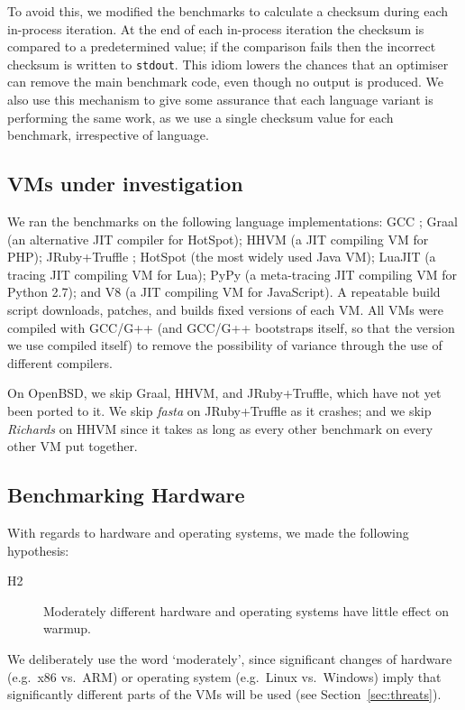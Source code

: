 \documentclass[preprint,numbers,10pt]{sigplanconf}
\newcommand{\hyptwo}{H2\xspace}
\newcommand{\richards}{\emph{Richards}\xspace}
\newcommand{\fasta}{\emph{fasta}\xspace}
\begin{document}
To avoid this, we modified the benchmarks to calculate a checksum
during each in-process iteration. At the end of each in-process iteration
the checksum is compared to a predetermined value; if the comparison fails then
the incorrect checksum is written to \texttt{stdout}. This idiom
lowers the chances that an optimiser can remove the main benchmark
code, even though no output is produced. We also use this mechanism to give some assurance
that each language variant is performing the same work, as we use a single
checksum value for each benchmark, irrespective of language.


\subsection{VMs under investigation}

We ran the benchmarks on the following language implementations: GCC \gccversion;
Graal \graalversion (an alternative JIT compiler for HotSpot); HHVM \hhvmversion (a JIT
compiling VM for PHP); JRuby+Truffle \jrubytruffleversion{};
HotSpot \hotspotversion (the most widely used Java
VM); LuaJIT \luajitversion (a tracing JIT compiling VM for Lua); PyPy \pypyversion (a
meta-tracing JIT compiling VM for Python 2.7); and V8 \veightversion (a JIT
compiling VM for JavaScript). A repeatable build script downloads, patches,
and builds fixed versions of each VM. All VMs were compiled with GCC/G++ \gccversion
(and GCC/G++ bootstraps itself, so that the version we use compiled itself)
to remove the possibility of variance through the use of different compilers.

\label{openbsd porting} On OpenBSD, we skip Graal, HHVM, and JRuby+Truffle, which have not yet been
ported to it. We skip \fasta on JRuby+Truffle as it crashes;
and we skip \richards on HHVM since it takes as long as every other benchmark
on every other VM put together.


\subsection{Benchmarking Hardware}

With regards to hardware and operating systems, we made the
following hypothesis:
\begin{description}
  \item[\hyptwo] Moderately different hardware and operating systems have little effect on warmup.
\end{description}
We deliberately use the word `moderately', since significant changes of hardware
(e.g.~x86 vs.~ARM) or operating system (e.g.~Linux vs.~Windows) imply that
significantly different parts of the VMs will be used (see Section~\ref{sec:threats}).
\end{document}
